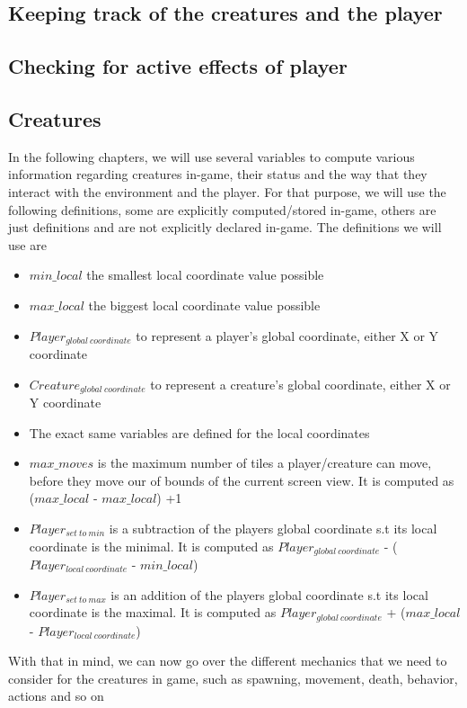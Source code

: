 \documentclass{report}
\begin{document}
\subsection*{Keeping track of the creatures and the player}

\subsection*{Checking for active effects of player}
\subsection*{Creatures}
In the following chapters, we will use several variables to compute various information regarding creatures in-game, their status and the way
that they interact with the environment and the player. For that purpose, we will use the following definitions, some are explicitly computed/stored in-game, others are just definitions and are not explicitly declared in-game. The definitions we will use are
\begin{itemize}
\item $min\_local$ the smallest local coordinate value possible 
\item $max\_local$ the biggest local coordinate value possible 
\item $Player_{global  \:coordinate}$  to represent a player's global coordinate, either X or Y coordinate 
\item $Creature_{global \: coordinate}$ to represent a creature's global coordinate, either X or Y coordinate 
\item The exact same variables are defined for the local coordinates 
\item $max\_moves$ is the maximum number of tiles a player/creature can move, before they move our of bounds of the current screen view. It is computed as  ($max\_local$ - $max\_local$) +1 
\item $Player_{set \: to \: min}$  is a subtraction of the players global coordinate s.t its local coordinate is the minimal. It is computed as  $Player_{global \: coordinate}$ - ($Player_{local \: coordinate}$ - $min\_local$)
\item $Player_{set \: to \: max}$  is an addition of the players global coordinate s.t its local coordinate is the maximal. It is computed as  $Player_{global \: coordinate}$ + ($max\_local$ - $Player_{local \: coordinate}$)
\end{itemize}
With that in mind, we can now go over the different mechanics that we need to consider for the creatures in game, such as spawning, movement, death, behavior, actions and so on
\end{document}
